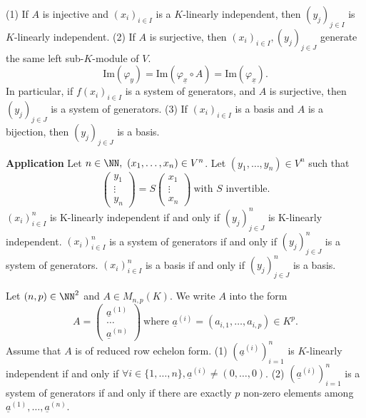 \begin{propositionenv}
\quad 
\newline
(1) If $A$ is injective and $(x_i)_{i\in I}$ is a $K$-linearly independent, then $(y_j)_{j\in I}$ is  $K$-linearly independent.
\newline
(2) If $A$ is surjective, then $(x_i)_{i\in I},(y_j)_{j\in J}$ generate the same left sub-$K$-module of $V$.
$$\mathrm{Im}(\varphi_y)=\mathrm{Im}(\varphi_{\underline{x}}\circ A)=\mathrm{Im}(\varphi_{\underline{x}}).$$
In particular, if $f(x_i)_{i\in I}$ is a system of generators, and $A$ is surjective, then $(y_j)_{j\in J}$ is a system of generators.
\newline
(3) If $(x_i)_{i\in I}$ is a basis and $A$ is a bijection, then $(y_j)_{j\in J}$ is a basis.
\end{propositionenv}
\begin{box2}
\textbf{Application} \quad Let $n\in \NN,\ (x_1,\dots,x_n)\in V^n$. Let $(y_1,\dots,y_n)\in V^n$ such that 
$$\begin{pmatrix}
y_1\\
\vdots\\
y_n
\end{pmatrix}=S\begin{pmatrix}
x_1\\
\vdots\\
x_n
\end{pmatrix}\ \text{with } S \text{ invertible.} $$ 
$(x_i)_{i\in I}^n$ is K-linearly independent if and only if $(y_j)_{j\in J}^n$ is K-linearly independent. 
\newline
$(x_i)_{i\in I}^n$ is a system of generators if and only if $(y_j)_{j\in J}^n$ is a system of generators.
\newline
$(x_i)_{i\in I}^n$ is a basis if and only if $(y_j)_{j\in J}^n$ is a basis.  
\end{box2}
\begin{theoremenv}
    Let $(n,p)\in \NN^2$ and $A\in M_{n,p}(K)$. We write $A$ into the form 
    $$A=\begin{pmatrix}
    \underline{a}^{(1)}\\
    \dots\\
    \underline{a}^{(n)}
    \end{pmatrix}\ \text{where } \underline{a}^{(i)}=(a_{i,1},\dots,a_{i,p})\in K^p.$$
Assume that $A$ is of reduced row echelon form. 
\newline
(1) $\left(\underline{a}^{(i)}\right)^n_{i=1}$ is $K$-linearly independent if and only if $\forall i\in \{1,\dots,n\},\underline{a}^{(i)}\not=(0,\dots,0)$.
\newline
(2) $\left(\underline{a}^{(i)}\right)^n_{i=1}$ is a system of generators if and only if there are exactly $p$ non-zero elements among $\underline{a}^{(1)},\dots,\underline{a}^{(n)}$.

\end{theoremenv}
